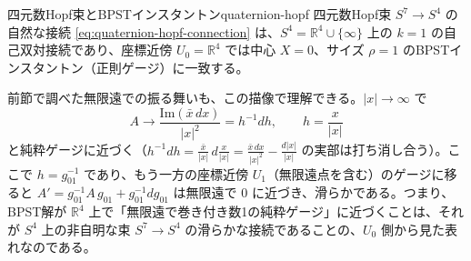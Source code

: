 \documentclass[uplatex, dvipdfmx, book]{jsbook}
\begin{document}
\begin{myprop}{四元数Hopf束とBPSTインスタントン}{quaternion-hopf}
四元数Hopf束 $S^7 \to S^4$ の自然な接続 \eqref{eq:quaternion-hopf-connection} は、$S^4 = \mathbb{R}^4 \cup \{\infty\}$ 上の $k = 1$ の自己双対接続であり、座標近傍 $U_0 = \mathbb{R}^4$ では中心 $X = 0$、サイズ $\rho = 1$ のBPSTインスタントン（正則ゲージ）に一致する。
\end{myprop}

前節で調べた無限遠での振る舞いも、この描像で理解できる。$|x| \to \infty$ で
\begin{equation}
    A \to \frac{\mathrm{Im}(\bar{x}\,dx)}{|x|^2} = h^{-1}dh, \qquad h = \frac{x}{|x|}
\end{equation}
と純粋ゲージに近づく（$h^{-1}dh = \frac{\bar{x}}{|x|}\, d\frac{x}{|x|} = \frac{\bar{x}\,dx}{|x|^2} - \frac{d|x|}{|x|}$ の実部は打ち消し合う）。ここで $h = g_{01}^{-1}$ であり、もう一方の座標近傍 $U_1$（無限遠点を含む）のゲージに移ると $A' = g_{01}^{-1}A\,g_{01} + g_{01}^{-1}dg_{01}$ は無限遠で $0$ に近づき、滑らかである。つまり、BPST解が $\mathbb{R}^4$ 上で「無限遠で巻き付き数1の純粋ゲージ」に近づくことは、それが $S^4$ 上の非自明な束 $S^7 \to S^4$ の滑らかな接続であることの、$U_0$ 側から見た表れなのである。
\end{document}
